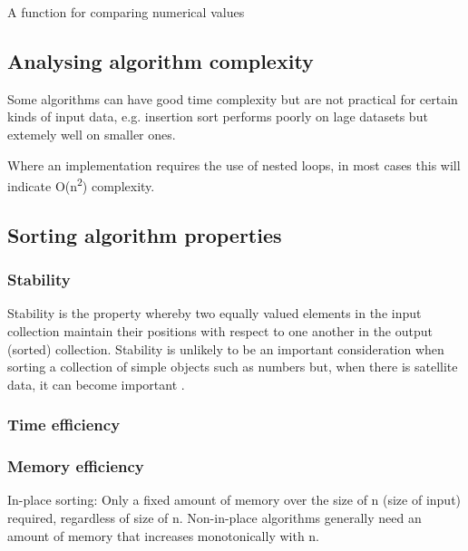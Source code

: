 \documentclass[12pt, a4paper]{article}
\begin{document}
\begin{algorithm}
\caption{A function for comparing numerical values}\label{euclid}
\begin{algorithmic}[1]
 
\EndIf
{} 
\EndIf
{} 
\EndIf
\EndProcedure
\end{algorithmic}
\end{algorithm}

\subsection{Analysing algorithm complexity}

Some algorithms can have good time complexity but are not practical for certain kinds of input data, e.g. insertion sort performs poorly on lage datasets but extemely well on smaller ones.

Where an implementation requires the use of nested loops, in most cases this will indicate O(n\textsuperscript{2}) complexity.

\subsection{Sorting algorithm properties}

\subsubsection{Stability}

Stability is the property whereby two equally valued elements in the input collection maintain their positions with respect to one another in the output (sorted) collection. Stability is unlikely to be an important consideration when sorting a collection of simple objects such as numbers but, when there is satellite data, it can become important \cite[p. 170]{cormen01introduction}.

\subsubsection{Time efficiency}

\subsubsection{Memory efficiency}
In-place sorting: Only a fixed amount of memory over the size of n (size of input) required, regardless of size of n. Non-in-place algorithms generally need an amount of memory that increases monotonically with n.
\end{document}
